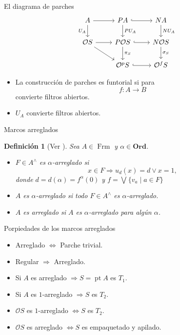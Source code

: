 \documentclass[compress,12pt]{beamer}
\DeclareMathOperator{\pt}{pt}
\DeclareMathOperator{\Frm}{Frm}
\newtheorem{dfn}{Definición}
\begin{document}
\begin{frame}[fragile]{El diagrama de parches}
\begin{equation}\label{Diagrama de parches}
\begin{tikzcd}
	A & PA & NA \\
	{\mathcal{O}S} & {P\mathcal{O}S} & {N\mathcal{O}S} \\
	& {\mathcal{O}^pS} & {\mathcal{O}^fS}
	\arrow[from=1-1, to=1-2]
	\arrow["{U_A}"', from=1-1, to=2-1]
	\arrow[hook, from=1-2, to=1-3]
	\arrow["{PU_A}", from=1-2, to=2-2]
	\arrow["{NU_A}", from=1-3, to=2-3]
	\arrow[from=2-1, to=2-2]
	\arrow[from=2-1, to=3-2]
	\arrow[hook, from=2-2, to=2-3]
	\arrow["{\pi_S}", from=2-2, to=3-2]
	\arrow["{\sigma_S}", from=2-3, to=3-3]
	\arrow[hook, from=3-2, to=3-3]
\end{tikzcd}
\end{equation}
\begin{itemize}
	\item<2-> La construcción de parches es funtorial si para
\[
f\colon A\to B
\]
convierte filtros abiertos.
\item<3-> $U_A$ convierte filtros abiertos.
\end{itemize}
\end{frame}

\begin{frame}{Marcos arreglados}
\begin{dfn}[Ver \cite{R.S.3}]\label{Marcoarreglado}
	Sea $A\in \Frm$ y $\alpha\in \mathbf{Ord}$. 
    \begin{itemize}
        \item<2-> $F\in A^\wedge$ es $\alpha$-arreglado si 
    \[
    x\in F\Rightarrow u_d(x)=d\vee x=1,
    \]
    donde $d=d(\alpha)=f^\alpha(0)$ y $f=\dot{\bigvee}\{v_a\mid a\in F\}$
    \item<3-> $A$ es $\alpha$-arreglado si todo $F\in A^\wedge$ es $\alpha$-arreglado.
    \item<4-> $A$ es arreglado si $A$ es $\alpha$-arreglado para algún $\alpha$.
    \end{itemize}
\end{dfn}
\end{frame}

\begin{frame}{Porpiedades de los marcos arreglados}
\begin{itemize}
	\item Arreglado $\Leftrightarrow$ Parche trivial.
	\item<2-> Regular $\Rightarrow$ Arreglado.
	\item<3-> Si $A$ es arreglado $\Rightarrow S=\pt A$ es $T_1$.
	\item<4-> Si $A$ es $1$-arreglado $\Rightarrow S$ es $T_2$.
	\item<5-> $\mathcal{O}S$ es $1$-arreglado $\Leftrightarrow S$ es $T_2$.
	\item<6-> $\mathcal{O}S$ es arreglado $\Leftrightarrow S$ es empaquetado y apilado.  
\end{itemize}
\end{frame}
\end{document}
